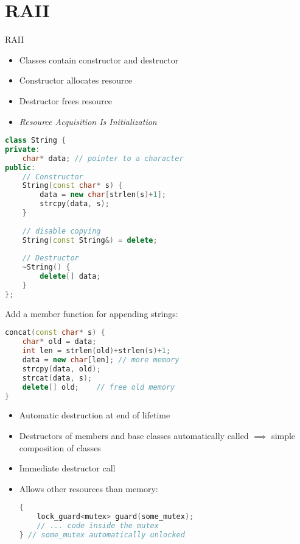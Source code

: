 \documentclass[xcolor=colortbl
]{beamer}
\begin{document}
\section{RAII}

\begin{frame}{RAII}
    \begin{itemize}
        \item Classes contain constructor and destructor
        \item Constructor allocates resource
        \item Destructor frees resource
        \item \emph{Resource Acquisition Is Initialization}
    \end{itemize}
\end{frame}


\begin{frame}
\begin{lstlisting}[language=c++,frame=single]
class String {
private:
    char* data; // pointer to a character
public:
    // Constructor
    String(const char* s) {
        data = new char[strlen(s)+1];
        strcpy(data, s);
    }
    
    // disable copying
    String(const String&) = delete;
    
    // Destructor
    ~String() {
        delete[] data;
    }
};
\end{lstlisting}
\end{frame}

\begin{frame}[fragile]
    Add a member function for appending strings:
\begin{lstlisting}[language=c++, frame=single]
concat(const char* s) {
    char* old = data;
    int len = strlen(old)+strlen(s)+1;
    data = new char[len]; // more memory
    strcpy(data, old);
    strcat(data, s);
    delete[] old;    // free old memory
}
\end{lstlisting}

\end{frame}



\begin{frame}[fragile]
    \begin{itemize}
        \item Automatic destruction at end of lifetime
        \item Destructors of members and base classes automatically called
            $ \implies $ simple composition of classes
        \item Immediate destructor call
        \item Allows other resources than memory:
        \begin{lstlisting}[language=c++, frame=single]
{
    lock_guard<mutex> guard(some_mutex);
    // ... code inside the mutex
} // some_mutex automatically unlocked
        \end{lstlisting}
    \end{itemize}
\end{frame}
\end{document}
